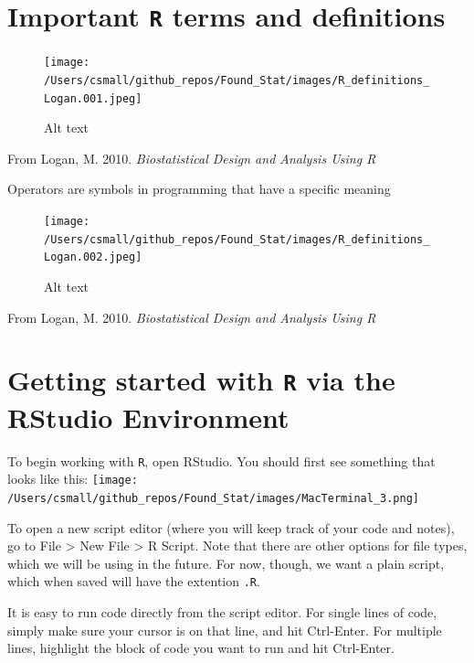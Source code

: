 \documentclass[]{book}
\begin{document}
\hypertarget{important-r-terms-and-definitions}{%
\section{\texorpdfstring{Important \texttt{R} terms and definitions}{Important R terms and definitions}}\label{important-r-terms-and-definitions}}

\begin{figure}
\centering
\texttt{[image: /Users/csmall/github\_repos/Found\_Stat/images/R\_definitions\_Logan.001.jpeg]}
\caption{Alt text}
\end{figure}

From Logan, M. 2010. \emph{Biostatistical Design and Analysis Using R}

Operators are symbols in programming that have a specific meaning

\begin{figure}
\centering
\texttt{[image: /Users/csmall/github\_repos/Found\_Stat/images/R\_definitions\_Logan.002.jpeg]}
\caption{Alt text}
\end{figure}

From Logan, M. 2010. \emph{Biostatistical Design and Analysis Using R}

\hypertarget{getting-started-with-r-via-the-rstudio-environment}{%
\section{\texorpdfstring{Getting started with \texttt{R} via the RStudio Environment}{Getting started with R via the RStudio Environment}}\label{getting-started-with-r-via-the-rstudio-environment}}

To begin working with \texttt{R}, open RStudio. You should first see something that looks like this:
\texttt{[image: /Users/csmall/github\_repos/Found\_Stat/images/MacTerminal\_3.png]}

To open a new script editor (where you will keep track of your code and notes), go to File \textgreater{} New File \textgreater{} R Script. Note that there are other options for file types, which we will be using in the future. For now, though, we want a plain script, which when saved will have the extention \texttt{.R}.

It is easy to run code directly from the script editor. For single lines of code, simply make sure your cursor is on that line, and hit Ctrl-Enter. For multiple lines, highlight the block of code you want to run and hit Ctrl-Enter.
\end{document}
